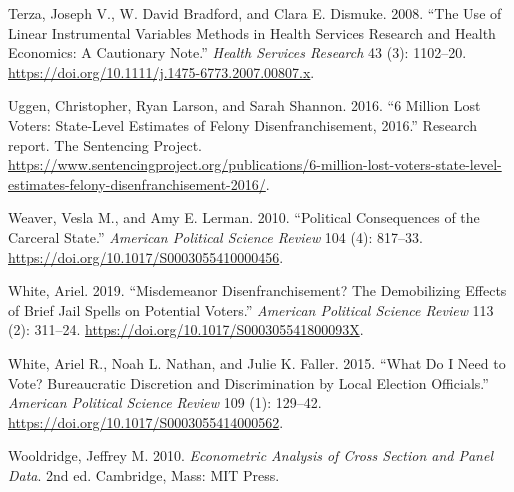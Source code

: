 \documentclass[
  12pt,
]{article}
\newlength{\cslhangindent}
\newenvironment{cslreferences}%
  {\setlength{\parindent}{0pt}%
  \everypar{\setlength{\hangindent}{\cslhangindent}}\ignorespaces}%
  {\par}
\begin{document}
\begin{cslreferences}
\leavevmode\hypertarget{ref-Terza2008}{}%
Terza, Joseph V., W. David Bradford, and Clara E. Dismuke. 2008. ``The Use of Linear Instrumental Variables Methods in Health Services Research and Health Economics: A Cautionary Note.'' \emph{Health Services Research} 43 (3): 1102--20. \url{https://doi.org/10.1111/j.1475-6773.2007.00807.x}.

\leavevmode\hypertarget{ref-sentencing_2016}{}%
Uggen, Christopher, Ryan Larson, and Sarah Shannon. 2016. ``6 Million Lost Voters: State-Level Estimates of Felony Disenfranchisement, 2016.'' Research report. The Sentencing Project. \url{https://www.sentencingproject.org/publications/6-million-lost-voters-state-level-estimates-felony-disenfranchisement-2016/}.

\leavevmode\hypertarget{ref-Weaver2010}{}%
Weaver, Vesla M., and Amy E. Lerman. 2010. ``Political Consequences of the Carceral State.'' \emph{American Political Science Review} 104 (4): 817--33. \url{https://doi.org/10.1017/S0003055410000456}.

\leavevmode\hypertarget{ref-White2019}{}%
White, Ariel. 2019. ``Misdemeanor Disenfranchisement? The Demobilizing Effects of Brief Jail Spells on Potential Voters.'' \emph{American Political Science Review} 113 (2): 311--24. \url{https://doi.org/10.1017/S000305541800093X}.

\leavevmode\hypertarget{ref-White2015}{}%
White, Ariel R., Noah L. Nathan, and Julie K. Faller. 2015. ``What Do I Need to Vote? Bureaucratic Discretion and Discrimination by Local Election Officials.'' \emph{American Political Science Review} 109 (1): 129--42. \url{https://doi.org/10.1017/S0003055414000562}.

\leavevmode\hypertarget{ref-Wooldridge2010}{}%
Wooldridge, Jeffrey M. 2010. \emph{Econometric Analysis of Cross Section and Panel Data}. 2nd ed. Cambridge, Mass: MIT Press.
\end{cslreferences}
\end{document}
